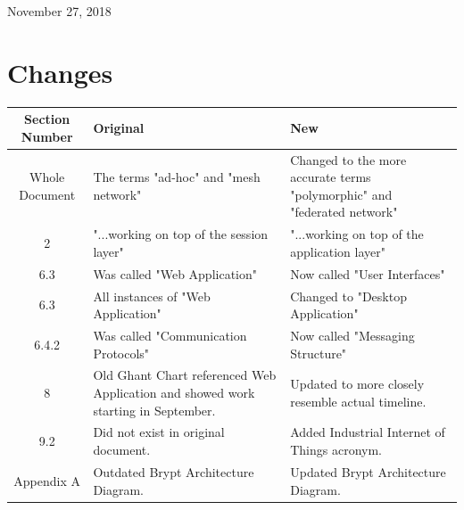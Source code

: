 \documentclass[tikz,a4paper,titlepage]{article}
\begin{document}
\begin{titlepage}

{\large November 27, 2018}\\[3cm] %




\vfill %

\end{titlepage}

\tableofcontents
\newpage

\section{Changes}
\begin{center}
    \begin{tabular}{|c|p{5cm}|p{5cm}|}
        \hline
        \textbf{Section Number} &  \textbf{Original} & \textbf{New} \\ \hline
        Whole Document & The terms "ad-hoc" and "mesh network" & Changed to the more accurate terms "polymorphic" and "federated network" \\ \hline
        2 & "...working on top of the session layer" & "...working on top of the application layer" \\ \hline
        6.3 & Was called "Web Application" & Now called "User Interfaces" \\ \hline
        6.3 & All instances of "Web Application" & Changed to "Desktop Application" \\ \hline
        6.4.2 & Was called "Communication Protocols" & Now called "Messaging Structure" \\ \hline
        8 & Old Ghant Chart referenced Web Application and showed work starting in September. & Updated to more closely resemble actual timeline. \\ \hline
        9.2 & Did not exist in original document. & Added Industrial Internet of Things acronym. \\ \hline
        Appendix A & Outdated Brypt Architecture Diagram. & Updated Brypt Architecture Diagram. \\ \hline
    \end{tabular}
\end{center}
\end{document}
